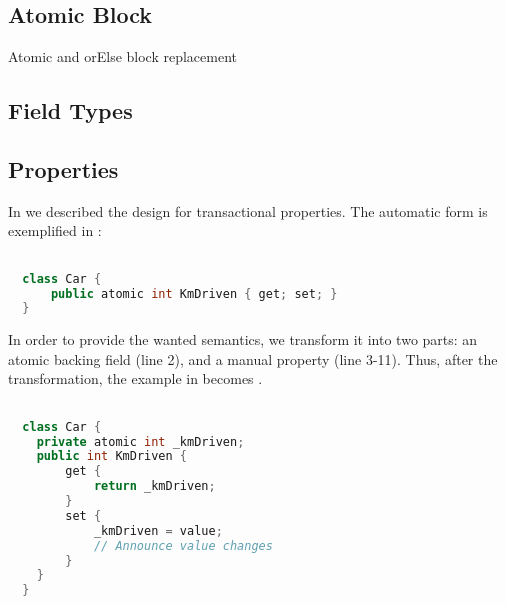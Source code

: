 \subsection{Atomic Block}
Atomic and orElse block replacement

\subsection{Field Types}\label{subsec:extension_field}
\subsection{Properties}
In  we described the design for transactional properties. The automatic form is exemplified in :

\begin{lstlisting}[label=lst:before_atomic_property,
  caption={Before Transformation},
  language=Java,  
  showspaces=false,
  showtabs=false,
  breaklines=true,
  showstringspaces=false,
  breakatwhitespace=true,
  commentstyle=\color{greencomments},
  keywordstyle=\color{bluekeywords},
  stringstyle=\color{redstrings},
  morekeywords={atomic, retry, orElse, var, get, set}]  % Start your code-block

  class Car {
      public atomic int KmDriven { get; set; }
  }
\end{lstlisting}

In order to provide the wanted semantics, we transform it into two parts: an atomic backing field (line 2), and a manual property (line 3-11). Thus, after the transformation, the example in  becomes . 

\begin{lstlisting}[label=lst:after_atomic_property,
  caption={After Transformation},
  language=Java,  
  showspaces=false,
  showtabs=false,
  breaklines=true,
  showstringspaces=false,
  breakatwhitespace=true,
  commentstyle=\color{greencomments},
  keywordstyle=\color{bluekeywords},
  stringstyle=\color{redstrings},
  morekeywords={atomic, retry, orElse, var, get, set}]  % Start your code-block

  class Car {
    private atomic int _kmDriven;
    public int KmDriven {
        get {
            return _kmDriven;
        }
        set {
            _kmDriven = value;
            // Announce value changes
        }
    }
  }
\end{lstlisting}

